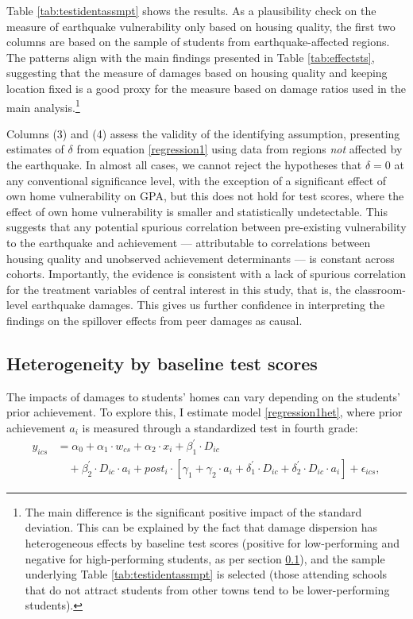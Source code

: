 Table \ref{tab:testidentassmpt} shows the results. As a plausibility check on the measure of earthquake vulnerability only based on housing quality, the first two columns are based on the sample of students from earthquake-affected regions. The patterns align with the main findings presented in Table \ref{tab:effectsts}, suggesting that the measure of damages based on housing quality and keeping location fixed is a good proxy for the measure based on damage ratios used in the main analysis.\footnote{The main difference is the significant positive impact of the standard deviation. This can be explained by the fact that damage dispersion has heterogeneous effects by baseline test scores (positive for low-performing and negative for high-performing students, as per section \ref{sec:het_ability}), and the sample underlying  Table \ref{tab:testidentassmpt} is selected (those attending schools that do not attract students from other towns tend to be lower-performing students).}\par 




Columns (3) and (4) assess the validity of the identifying assumption, presenting estimates of $\delta$ from equation \eqref{regression1} using data from regions {\itshape not} affected by the earthquake. In almost all cases, we cannot reject the hypotheses that $\delta=0$ at any conventional significance level, with the exception of a significant effect of own home vulnerability on GPA, but this does not hold for test scores, where the effect of own home vulnerability is smaller and statistically undetectable. This suggests that any potential spurious correlation between pre-existing vulnerability to the earthquake and achievement --- attributable to correlations between housing quality and unobserved achievement determinants --- is constant across cohorts. Importantly, the evidence is consistent with a lack of spurious correlation for the treatment variables of central interest in this study, that is, the classroom-level earthquake damages. This gives us further confidence in interpreting the findings on the spillover effects from peer damages as causal.\par


\subsection{Heterogeneity by baseline test scores }\label{sec:het_ability}

The impacts of damages to students' homes can vary depending on the students' prior achievement. To explore this, I estimate model \eqref{regression1het},  where prior achievement \(a_i\) is measured through a standardized test in fourth grade:
\vspace{-1em}
\begin{align}
y_{ics} &= \alpha_0 +\alpha_1\cdot w_{cs} + \alpha_2\cdot  x_i + \beta_1^{'}\cdot  D_{ic} \nonumber \\
&\quad + \beta_2^{'}\cdot  D_{ic}\cdot a_i+  post_i\cdot \left[ \gamma_1 + \gamma_2 \cdot a_i + \delta_1^{'}\cdot D_{ic} + \delta_2^{'}\cdot D_{ic}\cdot a_{i}\right] +\epsilon_{ics}, \label{regression1het} 
\end{align}

